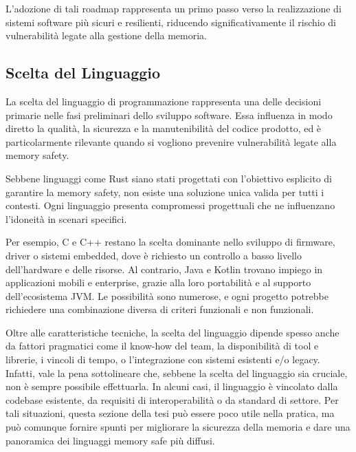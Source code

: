 L'adozione di tali roadmap rappresenta un primo passo verso la realizzazione di
sistemi software più sicuri e resilienti, riducendo significativamente il rischio
di vulnerabilità legate alla gestione della memoria.

\subsection{Scelta del Linguaggio}
\label{sec:linguaggio}

La scelta del linguaggio di programmazione rappresenta una delle decisioni
primarie nelle fasi preliminari dello sviluppo software. Essa influenza in modo diretto
la qualità, la sicurezza e la manutenibilità del codice prodotto, ed è particolarmente
rilevante quando si vogliono prevenire vulnerabilità legate alla memory safety.

Sebbene linguaggi come Rust siano stati progettati con l'obiettivo esplicito di garantire
la memory safety, non esiste una soluzione unica valida per tutti i contesti. Ogni
linguaggio presenta compromessi progettuali che ne influenzano l'idoneità in scenari
specifici.

Per esempio, C e C++ restano la scelta dominante nello sviluppo di firmware, driver
o sistemi embedded, dove è richiesto un controllo a basso livello dell'hardware
e delle risorse. Al contrario, Java e Kotlin trovano impiego in applicazioni
mobili e enterprise, grazie alla loro portabilità e al supporto dell'ecosistema JVM.
Le possibilità sono numerose, e ogni progetto potrebbe richiedere una combinazione
diversa di criteri funzionali e non funzionali.

Oltre alle caratteristiche tecniche, la scelta del linguaggio dipende spesso
anche da fattori pragmatici come il know-how del team, la disponibilità di tool e
librerie, i vincoli di tempo, o l'integrazione con sistemi esistenti e/o legacy.
Infatti, vale la pena sottolineare che, sebbene la scelta del linguaggio sia
cruciale, non è sempre possibile effettuarla. In alcuni casi, il linguaggio è vincolato
dalla codebase esistente, da requisiti di interoperabilità o da standard di
settore. Per tali situazioni, questa sezione della tesi può essere poco utile
nella pratica, ma può comunque fornire spunti per migliorare la sicurezza della memoria
e dare una panoramica dei linguaggi memory safe più diffusi.

